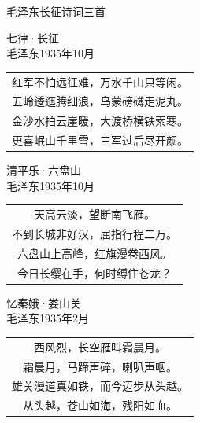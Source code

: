\documentclass[12pt, a4paper]{ctexart}
\begin{document}
\begin{center}
  {\heiti 毛泽东长征诗词三首}
\end{center}

\vspace{1cm}

\begin{center}
  {\heiti 七律·长征}\\[0.2cm]
  {\kaishu 毛泽东\quad 1935年10月}
\end{center}

\vspace{0.3cm}

\begin{center}
  {\kaishu
  \begin{tabular}{c}
    红军不怕远征难，万水千山只等闲。 \\
    五岭逶迤腾细浪，乌蒙磅礴走泥丸。 \\
    金沙水拍云崖暖，大渡桥横铁索寒。 \\
    更喜岷山千里雪，三军过后尽开颜。
  \end{tabular}}
\end{center}

\vspace{1.2cm}

\begin{center}
  {\heiti 清平乐·六盘山}\\[0.2cm]
  {\kaishu 毛泽东\quad 1935年10月}
\end{center}

\vspace{0.3cm}

\begin{center}
  {\kaishu
  \begin{tabular}{c}
    天高云淡，望断南飞雁。 \\
    不到长城非好汉，屈指行程二万。 \\[0.4cm]
    六盘山上高峰，红旗漫卷西风。 \\
    今日长缨在手，何时缚住苍龙？
  \end{tabular}}
\end{center}

\vspace{1.2cm}

\begin{center}
  {\heiti 忆秦娥·娄山关}\\[0.2cm]
  {\kaishu 毛泽东\quad 1935年2月}
\end{center}

\vspace{0.3cm}

\begin{center}
  {\kaishu
  \begin{tabular}{c}
    西风烈，长空雁叫霜晨月。 \\
    霜晨月，马蹄声碎，喇叭声咽。 \\[0.4cm]
    雄关漫道真如铁，而今迈步从头越。 \\
    从头越，苍山如海，残阳如血。
  \end{tabular}}
\end{center}
\end{document}
